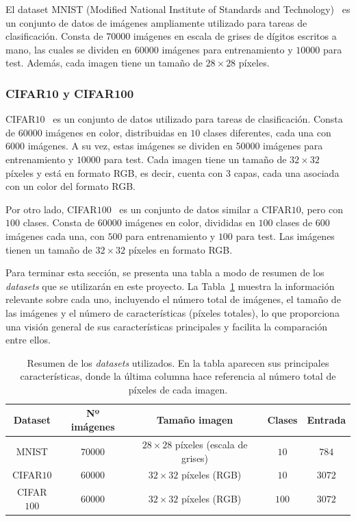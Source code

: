 El dataset MNIST (Modified National Institute of Standards and Technology)~\cite{LeCun1998} es un conjunto de datos de imágenes ampliamente utilizado para tareas de clasificación. Consta de $70000$ imágenes en escala de grises de dígitos escritos a mano, las cuales se dividen en $60000$ imágenes para entrenamiento y $10000$ para test. Además, cada imagen tiene un tamaño de $28 \times 28$ píxeles.

\subsubsection{CIFAR10 y CIFAR100}\label{subsubsec:CIFAR10-y-CIFAR100}

CIFAR$10$~\cite{Krizhevsky2009} es un conjunto de datos utilizado para tareas de clasificación. Consta de $60000$ imágenes en color, distribuidas en $10$ clases diferentes, cada una con $6000$ imágenes. A su vez, estas imágenes se dividen en $50000$ imágenes para entrenamiento y $10000$ para test. Cada imagen tiene un tamaño de $32 \times 32$ píxeles y está en formato RGB, es decir, cuenta con $3$ capas, cada una asociada con un color del formato RGB.

Por otro lado, CIFAR$100$~\cite{Krizhevsky2009} es un conjunto de datos similar a CIFAR$10$, pero con $100$ clases. Consta de $60000$ imágenes en color, divididas en $100$ clases de $600$ imágenes cada una, con $500$ para entrenamiento y $100$ para test. Las imágenes tienen un tamaño de $32 \times 32$ píxeles en formato RGB.

Para terminar esta sección, se presenta una tabla a modo de resumen de los \textit{datasets} que se utilizarán en este proyecto. La Tabla~\ref{tab:datasets} muestra la información relevante sobre cada uno, incluyendo el número total de imágenes, el tamaño de las imágenes y el número de características (píxeles totales), lo que proporciona una visión general de sus características principales y facilita la comparación entre ellos.

\begin{table}[h]
    \centering
    \begin{tabular}{|c|c|c|c|c|}
    \hline
    \textbf{Dataset} & \textbf{Nº imágenes} & \textbf{Tamaño imagen} & \textbf{Clases} & \textbf{Entrada} \\
    \hline
    MNIST & $70000$ & $28 \times 28$ píxeles (escala de grises) & $10$ & $784$ \\
    CIFAR$10$ & $60000$ & $32 \times 32$ píxeles (RGB) & $10$ & $3072$ \\
    CIFAR$100$ & $60000$ & $32 \times 32$ píxeles (RGB) & $100$ & $3072$ \\
    \hline
    \end{tabular}
    \caption[Resumen de los \textit{datasets} utilizados.]{Resumen de los \textit{datasets} utilizados. En la tabla aparecen sus principales características, donde la última columna hace referencia al número total de píxeles de cada imagen.}\label{tab:datasets}
\end{table}

